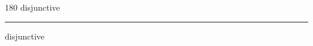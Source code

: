 
\begin{frame}
\begin{center}
\begin{turn}{180}
{\fontsize{2.5cm}{1em}\selectfont disjunctive}
\end{turn}
\vspace{1em}\par  
\hrule
\vspace{1em}\par  
{\fontsize{2.5cm}{1em}\selectfont disjunctive}
\end{center}
\end{frame}
